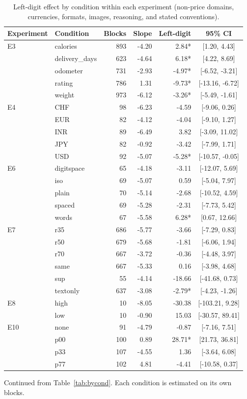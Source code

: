 \begin{table}[t]
\centering
\caption{Left-digit effect by condition within each experiment (non-price domains, currencies, formats, images, reasoning, and stated conventions).}
\label{tab:bycond2}
\small
\begin{tabular}{llrrrc}
\toprule
Experiment & Condition & Blocks & Slope & Left-digit & 95\% CI \\
\midrule
E3 & calories & 893 & -4.20 & 2.84* & [1.20, 4.43] \\
 & delivery\_days & 623 & -4.64 & 6.18* & [4.22, 8.69] \\
 & odometer & 731 & -2.93 & -4.97* & [-6.52, -3.21] \\
 & rating & 786 & 1.31 & -9.73* & [-13.16, -6.72] \\
 & weight & 973 & -6.12 & -3.26* & [-5.49, -1.61] \\ \addlinespace
E4 & CHF &  98 & -6.23 & -4.59 & [-9.06, 0.26] \\
 & EUR &  82 & -4.12 & -4.04 & [-9.10, 1.27] \\
 & INR &  89 & -6.49 & 3.82 & [-3.09, 11.02] \\
 & JPY &  82 & -0.92 & -3.42 & [-7.99, 1.71] \\
 & USD &  92 & -5.07 & -5.28* & [-10.57, -0.05] \\ \addlinespace
E6 & digitspace &  65 & -4.18 & -3.11 & [-12.07, 5.69] \\
 & iso &  69 & -5.07 & 0.59 & [-5.04, 7.97] \\
 & plain &  70 & -5.14 & -2.68 & [-10.52, 4.59] \\
 & spaced &  69 & -5.28 & -2.31 & [-7.73, 5.42] \\
 & words &  67 & -5.58 & 6.28* & [0.67, 12.66] \\ \addlinespace
E7 & r35 & 686 & -5.77 & -3.66 & [-7.29, 0.83] \\
 & r50 & 679 & -5.68 & -1.81 & [-6.06, 1.94] \\
 & r70 & 667 & -3.72 & -0.36 & [-4.48, 3.97] \\
 & same & 667 & -5.33 & 0.16 & [-3.98, 4.68] \\
 & sup &  55 & -4.14 & -18.66 & [-41.68, 0.73] \\
 & textonly & 637 & -3.08 & -2.79* & [-4.23, -1.26] \\ \addlinespace
E8 & high &  10 & -8.05 & -30.38 & [-103.21, 9.28] \\
 & low &  10 & -0.90 & 15.03 & [-30.57, 89.41] \\ \addlinespace
E10 & none &  91 & -4.79 & -0.87 & [-7.16, 7.51] \\
 & p00 & 100 & 0.89 & 28.71* & [21.73, 36.81] \\
 & p33 & 107 & -4.55 & 1.36 & [-3.64, 6.08] \\
 & p77 & 102 & 4.81 & -4.41 & [-10.58, 0.37] \\
\bottomrule
\end{tabular}
\vspace{2pt}
\parbox{\linewidth}{\footnotesize Continued from Table~\ref{tab:bycond}. Each condition is estimated on its own blocks.}
\end{table}
